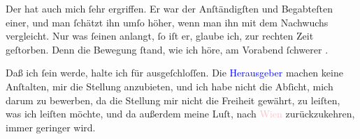 \pstart
           Der \label{K_L03449-4v}\label{K_L03449-4h} hat auch
               mich ſehr ergriffen. Er war der Anſtändigſten und Begabteſten  einer, und \strikeout{\textcolor{gray}{×}} man ſchätzt ihn umſo höher, wenn man  ihn mit dem Nachwuchs vergleicht.
               Nur was ſeinen \label{K_L03449-5v}\label{K_L03449-5h} anlangt, ſo iſt {\pb}er, glaube ich, zur rechten
               Zeit geſtorben. Denn die Bewegung ſtand, wie ich höre, am Vorabend ſchwerer \label{K_L03449-6v}\label{K_L03449-6h}.\pend
           
\pstart
           Daß ich ſein \label{K_L03449-7v}\label{K_L03449-7h} werde, halte ich für ausgeſchloſſen. Die \textcolor{blue}{Herausgeber}{}\ledrightnote{{$\rightarrow$}\textcolor{blue}{Eduard Bacher}{\newline}{$\rightarrow$}\textcolor{blue}{Moriz Benedikt}} machen keine Anſtalten, mir die
               Stellung anzubieten, und ich habe nicht die Abſicht, mich darum zu bewerben, da die
               Stellung mir nicht die Freiheit gewährt, zu leiſten, was ich leiſten möchte, und da
               außerdem meine Luſt, nach \textcolor{pink}{Wien}{}\ledrightnote{\textcolor{pink}{Wien}} zurückzukehren,
               immer geringer wird.\pend
           
